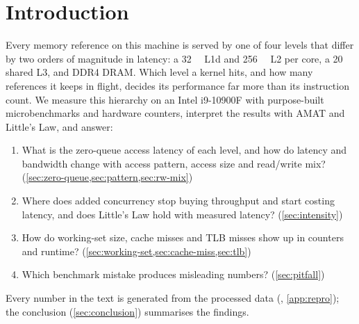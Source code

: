 \section{Introduction}\label{sec:intro}

Every memory reference on this machine is served by one of four levels that differ by two orders of
magnitude in latency: a \qty{32}{\kibi\byte} L1d and \qty{256}{\kibi\byte} L2 per core, a
\qty{20}{\mebi\byte} shared L3, and DDR4 DRAM. Which level a kernel hits, and how many references it keeps in
flight, decides its performance far more than its instruction count. We measure this hierarchy on an Intel
i9-10900F with purpose-built microbenchmarks and hardware counters, interpret the results with AMAT and
Little's Law, and answer:
\begin{enumerate}[nosep]
  \item What is the zero-queue access latency of each level, and how do latency and bandwidth change with
        access pattern, access size and read/write mix? (\cref{sec:zero-queue,sec:pattern,sec:rw-mix})
  \item Where does added concurrency stop buying throughput and start costing latency, and does Little's
        Law hold with measured latency? (\cref{sec:intensity})
  \item How do working-set size, cache misses and TLB misses show up in counters and runtime?
        (\cref{sec:working-set,sec:cache-miss,sec:tlb})
  \item Which benchmark mistake produces misleading numbers? (\cref{sec:pitfall})
\end{enumerate}

Every number in the text is generated from the processed data (,
\cref{app:repro}); the conclusion (\cref{sec:conclusion}) summarises the findings.

